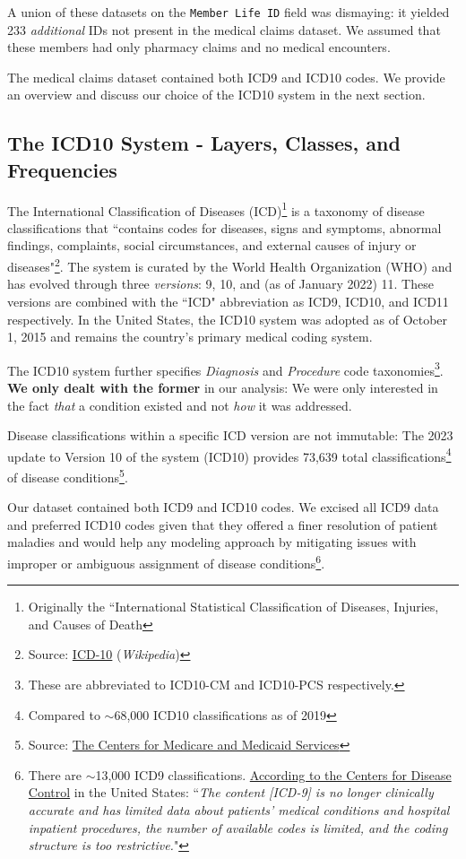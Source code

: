\documentclass[twoside,11pt]{article}
\newcommand*\circled[1]{\tikz[baseline=(char.base)]{
            \node[shape=circle,draw,inner sep=1pt] (char) {#1};}}
\begin{document}
A union of these datasets on the \texttt{Member Life ID} field was dismaying: it yielded 233 \textit{additional} IDs not present in the medical claims dataset. We assumed that these members had only pharmacy claims and no medical encounters.

The medical claims dataset contained both ICD9 and ICD10 codes. We provide an overview and discuss our choice of the ICD10 system in the next section.


\subsection{The ICD10 System - Layers, Classes, and Frequencies} \label{section:icd10layers}

The International Classification of Diseases (ICD)\footnote{Originally the ``International Statistical Classification of Diseases, Injuries, and Causes of Death} is a taxonomy of disease classifications that ``contains codes for diseases, signs and symptoms, abnormal findings, complaints, social circumstances, and external causes of injury or diseases"\footnote{Source: \href{https://en.wikipedia.org/wiki/ICD-10}{ICD-10} (\textit{Wikipedia})}. The system is curated by the World Health Organization (WHO) and has evolved through three \textit{versions}: 9, 10, and (as of January 2022) 11. These versions are combined with the ``ICD" abbreviation as ICD9, ICD10, and ICD11 respectively. In the United States, the ICD10 system was adopted as of October 1, 2015 and remains the country's primary medical coding system.

The ICD10 system further specifies \textit{Diagnosis} and \textit{Procedure} code taxonomies\footnote{These are abbreviated to ICD10-CM and ICD10-PCS respectively.}. \textbf{We only dealt with the former} in our analysis: We were only interested in the fact \textit{that} a condition existed and not \textit{how} it was addressed.

Disease classifications within a specific ICD version are not immutable: The 2023 update to Version 10 of the system (ICD10) provides 73,639 total classifications\footnote{Compared to $\sim$68,000 ICD10 classifications as of 2019} of disease conditions\footnote{Source: \href{https://www.cms.gov/medicare/icd-10/2023-icd-10-cm}{The Centers for Medicare and Medicaid Services}}.

Our dataset contained both ICD9 and ICD10 codes. We excised all ICD9 data and preferred ICD10 codes given that they \circled{1} offered a finer resolution of patient maladies and \circled{2} would help any modeling approach by mitigating issues with improper or ambiguous assignment of disease conditions\footnote{There are $\sim$13,000 ICD9 classifications. \href{https://www.cdc.gov/nchs/icd/icd10cm_pcs_background.htm}{According to the Centers for Disease Control} in the United States: ``\textit{The content [ICD-9] is no longer clinically accurate and has limited data about patients' medical conditions and hospital inpatient procedures, the number of available codes is limited, and the coding structure is too restrictive.}"}.
\end{document}
